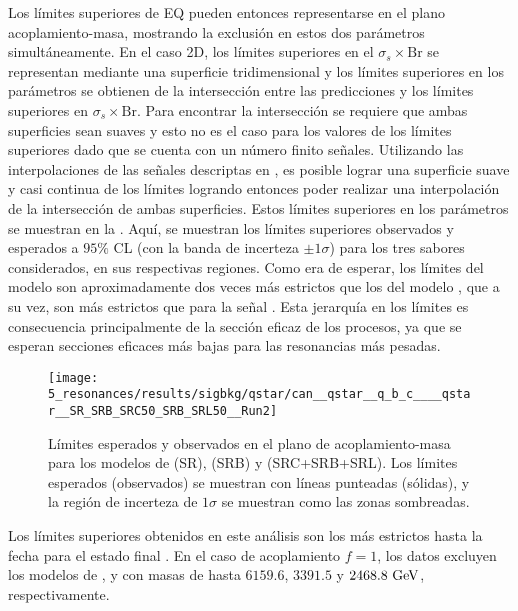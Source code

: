 Los límites superiores de \ac{EQ} pueden entonces representarse en el plano acoplamiento-masa, mostrando la exclusión en estos dos parámetros simultáneamente.
En el caso 2D, los límites superiores en el \(\sigma_s \times \text{Br}\) se representan mediante una superficie tridimensional y los límites superiores en los parámetros se obtienen de la intersección entre las predicciones y los límites superiores en \(\sigma_s \times \text{Br}\). Para encontrar la intersección se requiere que ambas superficies sean suaves y esto no es el caso para los valores de los límites superiores dado que se cuenta con un número finito señales. Utilizando las interpolaciones de las señales descriptas en \Sect{\ref{sec:signals:modeling}}, es posible lograr una superficie suave y casi continua de los límites logrando entonces poder realizar una interpolación de la intersección de ambas superficies. Estos límites superiores en los parámetros se muestran en la \Fig{\ref{fig:results:results:bkgsig:results:qstar:limits_2d}}. Aquí, se muestran los límites superiores observados y esperados a \(95\%\) \ac{CL} (con la banda de incerteza \(\pm 1 \sigma\)) para los tres sabores considerados, en sus respectivas regiones. Como era de esperar, los límites del modelo \qstar son aproximadamente dos veces más estrictos que los del modelo \cstar, que a su vez, son más estrictos que para la señal \bstar. Esta jerarquía en los límites es consecuencia principalmente de la sección eficaz de los procesos, ya que se esperan secciones eficaces más bajas para las resonancias más pesadas.

\begin{figure}[ht!]
    \centering
    \texttt{[image: 5\_resonances/results/sigbkg/qstar/can\_\_qstar\_\_q\_b\_c\_\_\_\_qstar\_\_SR\_SRB\_SRC50\_SRB\_SRL50\_\_Run2]}
    \caption{Límites esperados y observados en el plano de acoplamiento-masa para los modelos de \qstar (SR), \bstar (SRB) y \cstar (SRC+SRB+SRL). Los límites esperados (observados) se muestran con líneas punteadas (sólidas), y la región de incerteza de \(1\sigma\) se muestran como las zonas sombreadas.}
    \label{fig:results:results:bkgsig:results:qstar:limits_2d}
\end{figure}

Los límites superiores obtenidos en este análisis son los más estrictos hasta la fecha para el estado final \gammajet. En el caso de acoplamiento \(f=1\), los datos excluyen los modelos de \qstar, \cstar y \bstar con masas de hasta \(6159.6\), \(3391.5\) y \(2468.8~\text{GeV}\), respectivamente.



